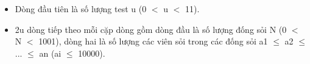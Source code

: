 \begin{itemize}
	\item     Dòng đầu tiên là số lượng test u (0 $<$ u $<$ 11).   
	\item     2u dòng tiếp theo mỗi cặp dòng gồm dòng đầu là số lượng đống sỏi N (0 $<$ N $<$ 1001), dòng hai là số lượng các viên sỏi trong các đống sỏi a1  $\le$  a2  $\le$  ...  $\le$  an (ai  $\le$  10000).   
\end{itemize}